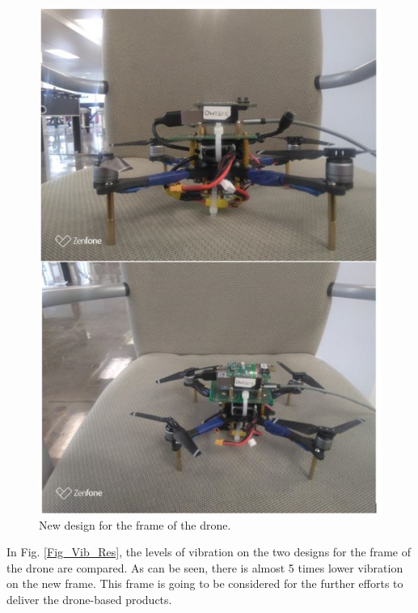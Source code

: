 \documentclass{article}
\begin{document}
\begin{figure}[thpb]
\centering
\includegraphics[scale=0.6]{Pics/New_Frame.jpg}
\caption{New design for the frame of the drone.}
\label{Fig_NewFrame}
\end{figure}

In Fig. \ref{Fig_Vib_Res}, the levels of vibration on the two designs for the frame of the drone are compared. As can be seen, there is almost 5 times lower vibration on the new frame. This frame is going to be considered for the further efforts to deliver the drone-based products.
\end{document}
